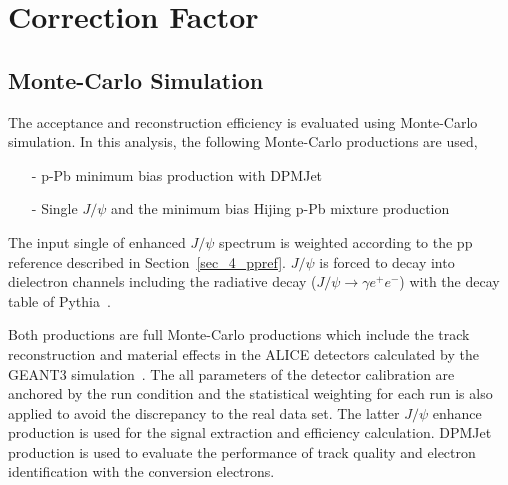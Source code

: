 \section{Correction Factor}
\subsection{Monte-Carlo Simulation}
\label{sec_4_mc}
The acceptance and reconstruction efficiency is evaluated  using Monte-Carlo simulation.  
In this analysis, the following Monte-Carlo productions are used,  
\begin{itemize}
\item[-] p-Pb minimum bias production with DPMJet~\cite{bib_dpmjet} 
\item[-] Single $J/\psi$ and the minimum bias Hijing p-Pb mixture production~\cite{bib_hijing}
\end{itemize}
The input single of enhanced $J/\psi$ spectrum is weighted according to the pp reference described in Section~\ref{sec_4_ppref}.
$J/\psi$ is forced to decay into dielectron channels including the radiative decay ($J/\psi\rightarrow \gamma e^{+}e^{-}$) with the decay table of Pythia~\cite{bib_pythia}. 

Both productions are full Monte-Carlo productions which include the track reconstruction and material effects in the ALICE detectors calculated by the GEANT3 simulation~\cite{bib_geant}.  
The all parameters of the detector calibration are anchored by the run condition and the statistical weighting for each run is also applied to avoid the discrepancy to the real data set. 
The latter $J/\psi$ enhance production is used for the signal extraction and efficiency calculation.
DPMJet production is used to evaluate the performance of track quality and electron identification with the conversion electrons.

